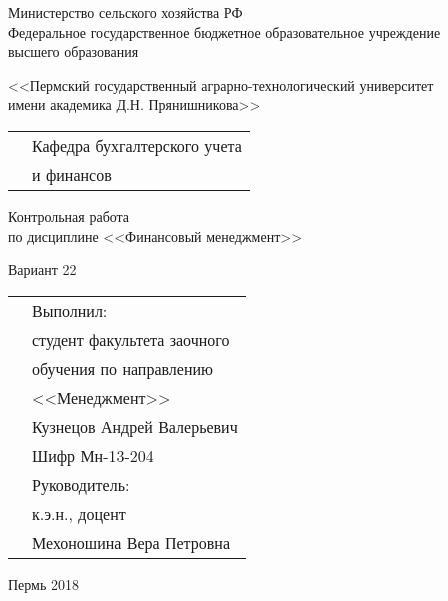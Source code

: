 \thispagestyle{empty}
\begin{center}
	Министерство сельского хозяйства РФ \\Федеральное государственное бюджетное образовательное учреждение\\ высшего образования
	\vspace{0.5ex}
	
	<<Пермский государственный аграрно-технологический университет\\ имени академика Д.Н. Прянишникова>>
\end{center}
\vspace{10ex}
\begin{tabularx}{\textwidth}{XX}
	& Кафедра бухгалтерского учета \\
	& и финансов
\end{tabularx}
\begin{center}
	\vspace{13ex}
	Контрольная работа\\
	по дисциплине <<Финансовый менеджмент>> \\
	\vspace{1ex}
	
	Вариант 22
\end{center}
	\vspace{8ex}
	\begin{tabularx}{\textwidth}{XX}
	& Выполнил:\\
	& студент факультета заочного \\
	& обучения по направлению \\
	& <<Менеджмент>> \\
	& Кузнецов Андрей Валерьевич \\
	& Шифр Мн-13-204\\
	& Руководитель:\\
	& к.э.н., доцент\\
	& Мехоношина Вера Петровна\\
	\end{tabularx}
\begin{center}
	\vfill
	Пермь 2018
\end{center}
